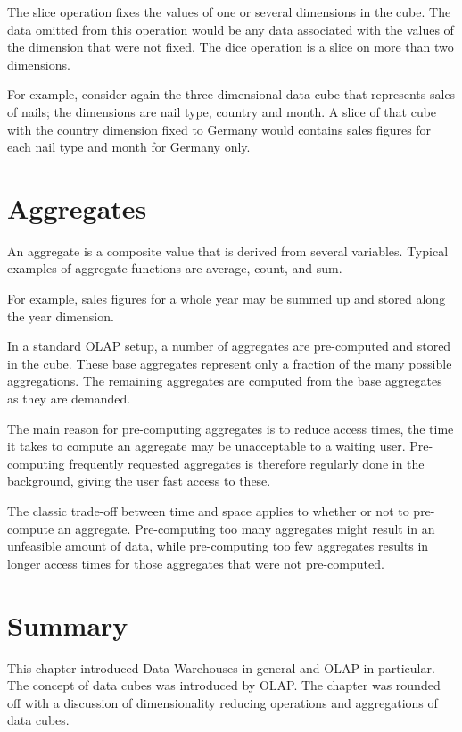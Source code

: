 The slice operation fixes the values of one or several dimensions in the cube.
The data omitted from this operation would be any data associated with the
values of the dimension that were not fixed. The dice operation is a slice on
more than two dimensions.

For example, consider again the three-dimensional data cube that represents
sales of nails; the dimensions are nail type, country and month. A slice of
that cube with the country dimension fixed to Germany would contains sales
figures for each nail type and month for Germany only.


\section{Aggregates}

An aggregate is a composite value that is derived from several variables.
Typical examples of aggregate functions are average, count, and sum.

For example, sales figures for a whole year may be summed up and stored along
the year dimension.

In a standard OLAP setup, a number of aggregates are pre-computed and
stored in the cube. These base aggregates represent only a fraction of the
many possible aggregations. The remaining aggregates are computed from the
base aggregates as they are demanded.

The main reason for pre-computing aggregates is to reduce access times, the
time it takes to compute an aggregate may be unacceptable to a waiting
user. Pre-computing frequently requested aggregates is therefore regularly
done in the background, giving the user fast access to these.
\cite{olap_solutions}

The classic trade-off between time and space applies to whether or not to
pre-compute an aggregate. Pre-computing too many aggregates might result in an
unfeasible amount of data, while pre-computing too few aggregates results in
longer access times for those aggregates that were not pre-computed.


\section*{Summary}

This chapter introduced Data Warehouses in general and OLAP in particular. The
concept of data cubes was introduced by OLAP. The chapter was rounded off with
a discussion of dimensionality reducing operations and aggregations of data
cubes.



